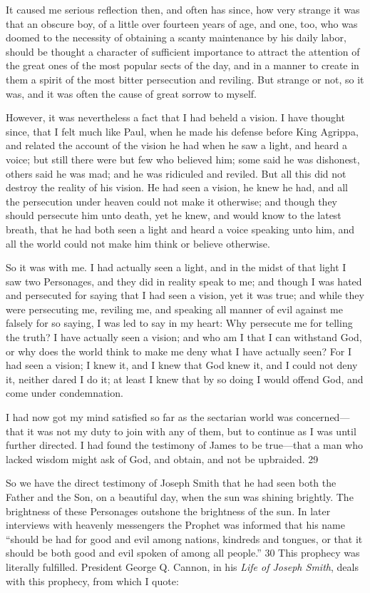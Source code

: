 It caused me serious reflection then, and often has since, how very strange it was that an
obscure boy, of a little over fourteen years of age, and one, too, who was doomed to the
necessity of obtaining a scanty maintenance by his daily labor, should be thought a character
of sufficient importance to attract the attention of the great ones of the most popular sects of
the day, and in a manner to create in them a spirit of the most bitter persecution and reviling.
But strange or not, so it was, and it was often the cause of great sorrow to myself.

However, it was nevertheless a fact that I had beheld a vision. I have thought since, that I felt
much like Paul, when he made his defense before King Agrippa, and related the account of
the vision he had when he saw a light, and heard a voice; but still there were but few who
believed him; some said he was dishonest, others said he was mad; and he was ridiculed and
reviled. But all this did not destroy the reality of his vision. He had seen a vision, he knew he
had, and all the persecution under heaven could not make it otherwise; and though they
should persecute him unto death, yet he knew, and would know to the latest breath, that he
had both seen a light and heard a voice speaking unto him, and all the world could not make
him think or believe otherwise.

So it was with me. I had actually seen a light, and in the midst of that light I saw two
Personages, and they did in reality speak to me; and though I was hated and persecuted for
saying that I had seen a vision, yet it was true; and while they were persecuting me, reviling
me, and speaking all manner of evil against me falsely for so saying, I was led to say in my
heart: Why persecute me for telling the truth? I have actually seen a vision; and who am I
that I can withstand God, or why does the world think to make me deny what I have actually
seen? For I had seen a vision; I knew it, and I knew that God knew it, and I could not deny it,
neither dared I do it; at least I knew that by so doing I would offend God, and come under
condemnation.

I had now got my mind satisfied so far as the sectarian world was concerned—that it was not
my duty to join with any of them, but to continue as I was until further directed. I had found
the testimony of James to be true—that a man who lacked wisdom might ask of God, and
obtain, and not be upbraided. 29

So we have the direct testimony of Joseph Smith that he had seen both the Father and the
Son, on a beautiful day, when the sun was shining brightly. The brightness of these
Personages outshone the brightness of the sun. In later interviews with heavenly messengers
the Prophet was informed that his name ``should be had for good and evil among nations,
kindreds and tongues, or that it should be both good and evil spoken of among all people.'' 30
This prophecy was literally fulfilled. President George Q. Cannon, in his \textit{Life of Joseph
Smith}, deals with this prophecy, from which I quote:

